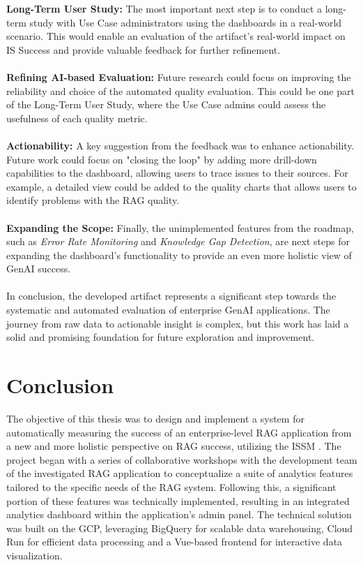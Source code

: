 \documentclass[
	english,
	ruledheaders=section,%
	class=report,%
	thesis={type=bachelor},%
	accentcolor=1b,%
	custommargins=true,%
	marginpar=false,%
	parskip=half-,%
	fontsize=11pt,%
	DIV=14,
]{tudapub}
\begin{document}
\textbf{Long-Term User Study:} The most important next step is to conduct a long-term study with Use Case administrators using the dashboards in a real-world scenario. This would enable an evaluation of the artifact's real-world impact on IS Success \parencite{DeloneMcLean2003ISSuccessTenYearUpdate} and provide valuable feedback for further refinement.\\
\\
\textbf{Refining AI-based Evaluation:} Future research could focus on improving the reliability and choice of the automated quality evaluation. This could be one part of the Long-Term User Study, where the Use Case admins could assess the usefulness of each quality metric.\\
\\
\textbf{Actionability:} A key suggestion from the feedback was to enhance actionability. Future work could focus on "closing the loop" by adding more drill-down capabilities to the dashboard, allowing users to trace issues to their sources. For example, a detailed view could be added to the quality charts that allows users to identify problems with the RAG quality.\\
\\
\textbf{Expanding the Scope:} Finally, the unimplemented features from the roadmap, such as \textit{Error Rate Monitoring} and \textit{Knowledge Gap Detection}, are next steps for expanding the dashboard's functionality to provide an even more holistic view of GenAI success.\\
\\
In conclusion, the developed artifact represents a significant step towards the systematic and automated evaluation of enterprise GenAI applications. The journey from raw data to actionable insight is complex, but this work has laid a solid and promising foundation for future exploration and improvement.

\chapter{Conclusion}
The objective of this thesis was to design and implement a system for automatically measuring the success of an enterprise-level RAG application from a new and more holistic perspective on RAG success, utilizing the ISSM \parencite{DeloneMcLean2003ISSuccessTenYearUpdate}. The project began with a series of collaborative workshops with the development team of the investigated RAG application to conceptualize a suite of analytics features tailored to the specific needs of the RAG system. Following this, a significant portion of these features was technically implemented, resulting in an integrated analytics dashboard within the application's admin panel. The technical solution was built on the GCP, leveraging BigQuery for scalable data warehousing, Cloud Run for efficient data processing and a Vue-based frontend for interactive data visualization.
\end{document}
